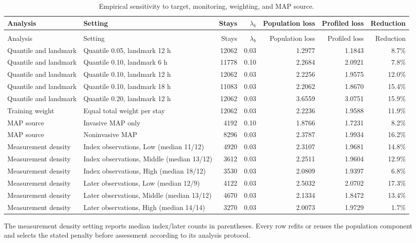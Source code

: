 \begingroup
\scriptsize
\setlength{\tabcolsep}{2pt}
\setlength{\LTleft}{0pt}
\setlength{\LTright}{0pt}
\begin{longtable}{>{\raggedright\arraybackslash}p{}>{\raggedright\arraybackslash}p{}rrrrr}
\caption{Empirical sensitivity to target, monitoring, weighting, and MAP source.}\label{tab:supp_empirical_sensitivity}\\
\toprule
Analysis & Setting & Stays & $\lambda_b$ & Population loss & Profiled loss & Reduction\\
\midrule
\endfirsthead
\multicolumn{7}{l}{\tablename\ \thetable\ continued}\\
\toprule
Analysis & Setting & Stays & $\lambda_b$ & Population loss & Profiled loss & Reduction\\
\midrule
\endhead
\bottomrule
\endlastfoot
Quantile and landmark & Quantile 0.05, landmark 12 h & 12062 & 0.03 & 1.2977 & 1.1843 & 8.7\%\\
Quantile and landmark & Quantile 0.10, landmark 6 h & 11778 & 0.10 & 2.2684 & 2.0921 & 7.8\%\\
Quantile and landmark & Quantile 0.10, landmark 12 h & 12062 & 0.03 & 2.2256 & 1.9575 & 12.0\%\\
Quantile and landmark & Quantile 0.10, landmark 18 h & 11083 & 0.03 & 2.2062 & 1.8670 & 15.4\%\\
Quantile and landmark & Quantile 0.20, landmark 12 h & 12062 & 0.03 & 3.6559 & 3.0751 & 15.9\%\\
Training weight & Equal total weight per stay & 12062 & 0.03 & 2.2236 & 1.9588 & 11.9\%\\
MAP source & Invasive MAP only & 4192 & 0.10 & 1.8766 & 1.7231 & 8.2\%\\
MAP source & Noninvasive MAP & 8296 & 0.03 & 2.3787 & 1.9934 & 16.2\%\\
Measurement density & Index observations, Low (median 11/12) & 4920 & 0.03 & 2.3107 & 1.9681 & 14.8\%\\
Measurement density & Index observations, Middle (median 13/12) & 3612 & 0.03 & 2.2511 & 1.9604 & 12.9\%\\
Measurement density & Index observations, High (median 18/12) & 3530 & 0.03 & 2.0809 & 1.9397 & 6.8\%\\
Measurement density & Later observations, Low (median 12/9) & 4122 & 0.03 & 2.5032 & 2.0702 & 17.3\%\\
Measurement density & Later observations, Middle (median 13/12) & 4670 & 0.03 & 2.1334 & 1.8472 & 13.4\%\\
Measurement density & Later observations, High (median 14/14) & 3270 & 0.03 & 2.0073 & 1.9729 & 1.7\%\\
\end{longtable}
\par\smallskip
\footnotesize{The measurement density setting reports median index/later counts in parentheses. Every row refits or reuses the population component and selects the stated penalty before assessment according to its analysis protocol.}
\endgroup

